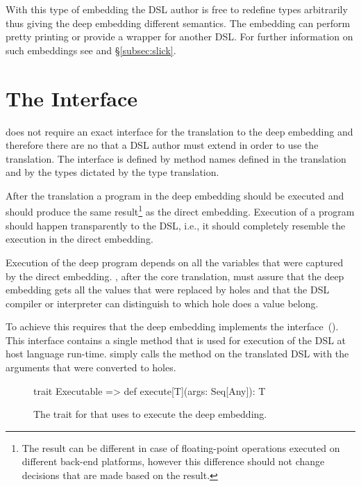 With this type of embedding the DSL author is free to redefine types arbitrarily thus giving the
 deep embedding different semantics. The embedding can perform pretty printing or provide a wrapper
 for another DSL. For further information on such embeddings see \cite{hofer_polymorphic_2008}
 and \S \ref{subsec:slick}.

\section{The \yy Interface}
\label{sec:yy-interface}

\yy does not require an exact interface for the translation to the deep embedding and therefore there are no  that
a DSL author must extend in order to use the translation. The interface is defined by method names
defined in the translation and by the types dictated by the type translation.

After the translation a program in the deep embedding should be executed and should produce
the same result\footnote{The result can be different in case of floating-point operations executed on
different back-end platforms, however this difference should not change decisions that are made based on the result.}
as the direct embedding. Execution of a program should happen transparently to the DSL, i.e., it should completely
resemble the execution in the direct embedding.

Execution of the deep program depends on all the variables that were captured by the
direct embedding. \yy, after the core translation, must assure that the deep embedding
gets all the values that were replaced by holes and that the DSL compiler or interpreter
can distinguish to which hole does a value belong.

To achieve this \yy requires that the deep embedding implements the
  interface~(). This interface
 contains a single method  that is used for execution of
 the DSL at host language run-time. \yy simply calls the method 
on the translated DSL with the arguments that were converted to holes.

\begin{figure}
\begin{listingtiny}
trait Executable { =>
  def execute[T](args: Seq[Any]): T
}
\end{listingtiny}
\caption{The trait for that \yy uses to execute the deep embedding.}
\label{fig:executable}
\end{figure}


